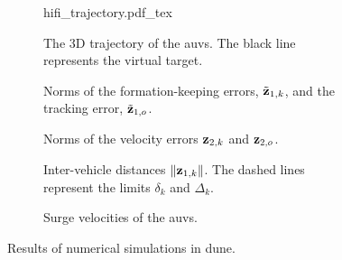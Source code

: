 \begin{figure}[p]
    \centering
    \begin{subfigure}{0.7\textwidth}
        \centering
        \def\svgwidth{\textwidth}
        {hifi_trajectory.pdf_tex}
        \vspace*{-6mm}
        \caption{The 3D trajectory of the \glspl{auv}. The black line represents the virtual target.}
        \label{fig:handpos_tracking_hifi_trajectory}
    \end{subfigure}  
    \begin{subfigure}{0.47\textwidth}
        \hspace*{-2mm}
        
        \vspace*{-6mm}
        \caption{Norms of the formation-keeping errors, $\tilde{\mathbf{z}}_{1, k}$, and the tracking error, $\tilde{\mathbf{z}}_{1, o}$.}
        \label{fig:handpos_tracking_hifi_formation_errors}
    \end{subfigure}
    \begin{subfigure}{0.47\textwidth}
        \hspace*{1mm}
        
        \vspace*{-6mm}
        \caption{Norms of the velocity errors $\mathbf{z}_{2, k}$ and $\mathbf{z}_{2, o}$.}
        \label{fig:handpos_tracking_hifi_velocity_errors}
    \end{subfigure}
    \begin{subfigure}{0.47\textwidth}
        \hspace*{-2mm}
        
        \vspace*{-6mm}
        \caption{Inter-vehicle distances $\left\|\mathbf{z}_{1, k}\right\|$. The dashed lines represent the limits $\delta_k$ and $\Delta_k$.}
        \label{fig:handpos_tracking_hifi_distances}
    \end{subfigure}
    \begin{subfigure}{0.47\textwidth}
        \vspace*{-40mm}
        \hspace*{-2mm}
        
        \vspace*{-6mm}
        \caption{Surge velocities of the \glspl{auv}.}
        \label{fig:handpos_tracking_hifi_surge}
    \end{subfigure}
    \caption{Results of numerical simulations in \gls{dune}.}
    \label{fig:handpos_tracking_hifi}
\end{figure}
